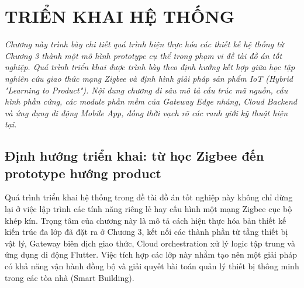 \chapter{TRIỂN KHAI HỆ THỐNG}
\label{ch:trienkhai}

\vspace{0.5cm}
\noindent\textit{Chương này trình bày chi tiết quá trình hiện thực hóa các thiết kế hệ thống từ Chương 3 thành một mô hình prototype cụ thể trong phạm vi đề tài đồ án tốt nghiệp. Quá trình triển khai được trình bày theo định hướng kết hợp giữa học tập nghiên cứu giao thức mạng Zigbee và định hình giải pháp sản phẩm IoT (Hybrid "Learning to Product"). Nội dung chương đi sâu mô tả cấu trúc mã nguồn, cấu hình phần cứng, các module phần mềm của Gateway Edge nhúng, Cloud Backend và ứng dụng di động Mobile App, đồng thời vạch rõ các ranh giới kỹ thuật hiện tại.}
\vspace{0.5cm}

\section{Định hướng triển khai: từ học Zigbee đến prototype hướng product}
\label{sec:ch4-orientation}

Quá trình triển khai hệ thống trong đề tài đồ án tốt nghiệp này không chỉ dừng lại ở việc lập trình các tính năng riêng lẻ hay cấu hình một mạng Zigbee cục bộ khép kín. Trọng tâm của chương này là mô tả cách hiện thực hóa bản thiết kế kiến trúc đa lớp đã đặt ra ở Chương 3, kết nối các thành phần từ tầng thiết bị vật lý, Gateway biên dịch giao thức, Cloud orchestration xử lý logic tập trung và ứng dụng di động Flutter. Việc tích hợp các lớp này nhằm tạo nên một giải pháp có khả năng vận hành đồng bộ và giải quyết bài toán quản lý thiết bị thông minh trong các tòa nhà (Smart Building).


